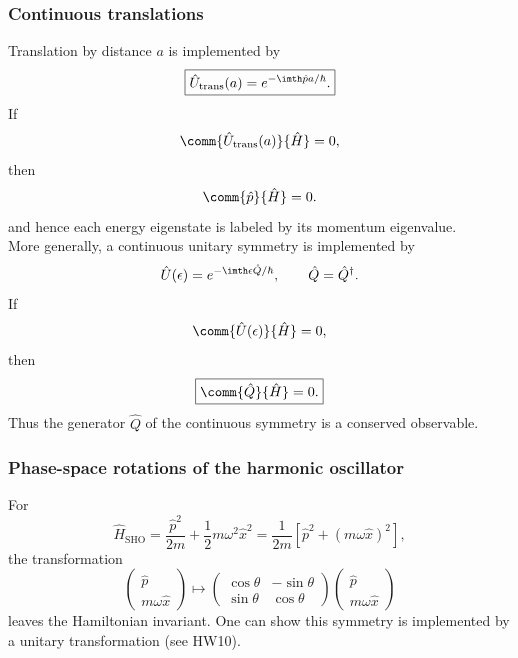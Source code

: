 \subsubsection{Continuous translations}
Translation by distance $a$ is implemented by
\begin{equation}
 \boxed{\hat U_{\mathrm{trans}}(a)
 =e^{-\imth\hat pa/\hbar}.}
\end{equation}
If
\begin{equation}
 \comm{\hat U_{\mathrm{trans}}(a)}{\hat H}=0,
\end{equation}
then
\begin{equation}
 \comm{\hat p}{\hat H}=0.
\end{equation}
and hence each energy eigenstate is labeled by its momentum eigenvalue.\\
More generally, a continuous unitary symmetry is implemented by
\begin{equation}
 \hat U(\epsilon)=e^{-\imth\epsilon\hat Q/\hbar},
 \qquad
 \hat Q=\hat Q^\dagger.
\end{equation}
If
\begin{equation}
 \comm{\hat U(\epsilon)}{\hat H}=0,
\end{equation}
then
\begin{equation}
 \boxed{\comm{\hat Q}{\hat H}=0.}
\end{equation}
Thus the generator $\hat Q$ of the continuous symmetry is a conserved observable.

\subsubsection{Phase-space rotations of the harmonic oscillator}
For
\begin{equation}
 \hat H_{\mathrm{SHO}}
 =\frac{\hat p^2}{2m}+\frac12m\omega^2\hat x^2
 =\frac{1}{2m}\left[\hat p^2+(m\omega\hat x)^2\right],
\end{equation}
the transformation
\begin{equation}
 \begin{pmatrix}\hat p\\m\omega\hat x\end{pmatrix}
 \longmapsto
 \begin{pmatrix}
 \cos\theta&-\sin\theta\\
 \sin\theta&\cos\theta
 \end{pmatrix}
 \begin{pmatrix}\hat p\\m\omega\hat x\end{pmatrix}
\end{equation}
leaves the Hamiltonian invariant. One can show this symmetry is implemented by a unitary transformation (see HW10). 


